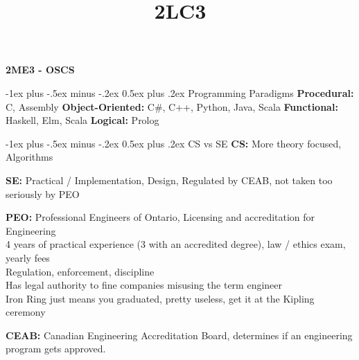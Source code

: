 \documentclass[letterpaper, 8pt]{extarticle}
\title{2LC3}
\makeatletter
\renewcommand{\section}{\@startsection{section}{1}{0mm}%
                                {-1ex plus -.5ex minus -.2ex}%
                                {0.5ex plus .2ex}%
                                {\normalfont\normalsize\bfseries}}
\makeatother
\begin{document}
\raggedright
\tiny

\begin{center}
    {\textbf{2ME3 - OSCS}} \\
\end{center}
\begin{multicols*}{6}
    \setlength{\premulticols}{1pt}
    \setlength{\postmulticols}{1pt}
    \setlength{\multicolsep}{1pt}
    \setlength{\columnsep}{2pt}

    \section{Programming Paradigms}
    \textbf{Procedural:} C, Assembly
    \textbf{Object-Oriented:} C\#, C++, Python, Java, Scala
    \textbf{Functional:} Haskell, Elm, Scala
    \textbf{Logical:} Prolog

    \section{CS vs SE}
    \textbf{CS:} More theory focused, Algorithms

    \textbf{SE:} Practical / Implementation, Design,
    Regulated by CEAB, not taken too seriously by PEO

    \textbf{PEO:} Professional Engineers of Ontario, Licensing and accreditation for Engineering \\
    4 years of practical experience (3 with an accredited degree), law / ethics exam, yearly fees \\
    Regulation, enforcement, discipline \\
    Has legal authority to fine companies misusing the term engineer \\
    Iron Ring just means you graduated, pretty useless, get it at the Kipling ceremony

    \textbf{CEAB:} Canadian Engineering Accreditation Board,
    determines if an engineering program gets approved.


\end{multicols*}
\end{document}
